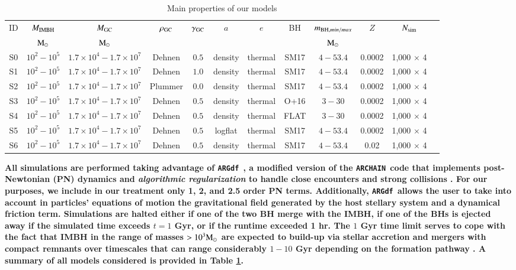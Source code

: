 \documentclass[article]{aa}
\newcommand{\Ms}{{\rm M}_\odot}
\newcommand{\gc}{{\rm GC}}
\newcommand{\ibh}{{\rm IMBH}}
\newcommand{\bh}{{\rm BH}}
\newcommand{\ARGdf}{\texttt{ARGdf~}}
\newcommand{\ARCHAIN}{\texttt{ARCHAIN~}}
\begin{document}
\begin{table}
\caption{Main properties of our models}
\begin{center}
\begin{tabular}{cccccccccccc}
\hline
\hline
ID & $M_\ibh$ & $M_\gc$ & $\rho_\gc$ & $\gamma_\gc$ & $a$ &$e$ &BH & $m_{\bh, min/max}$ & $Z$ & $N_{\rm sim}$ \\ 
   & $\Ms$    & $\Ms$   &            &              &     &    &   & $\Ms$              &     & \\
\hline
S0 & $10^2-10^5$ & $1.7\times 10^4 - 1.7\times 10^7$ & Dehnen & $0.5$ & density & thermal & SM17 & $4-53.4$ & 0.0002 & 1,000 $\times$ 4 \\
S1 & $10^2-10^5$ & $1.7\times 10^4 - 1.7\times 10^7$ & Dehnen & $1.0$ & density & thermal & SM17 & $4-53.4$ & 0.0002 & 1,000 $\times$ 4 \\
S2 & $10^2-10^5$ & $1.7\times 10^4 - 1.7\times 10^7$ & Plummer& $0.0$ & density & thermal & SM17 & $4-53.4$ & 0.0002 & 1,000 $\times$ 4 \\
S3 & $10^2-10^5$ & $1.7\times 10^4 - 1.7\times 10^7$ & Dehnen & $0.5$ & density & thermal & O+16 & $3-30$ & 0.0002 & 1,000 $\times$ 4 \\
S4 & $10^2-10^5$ & $1.7\times 10^4 - 1.7\times 10^7$ & Dehnen & $0.5$ & density & thermal & FLAT & $3-30$ & 0.0002 & 1,000 $\times$ 4 \\
S5 & $10^2-10^5$ & $1.7\times 10^4 - 1.7\times 10^7$ & Dehnen & $0.5$ & logflat & thermal & SM17 & $4-53.4$ & 0.0002 & 1,000 $\times$ 4 \\
S6 & $10^2-10^5$ & $1.7\times 10^4 - 1.7\times 10^7$ & Dehnen & $0.5$ & density & thermal & SM17 & $4-53.4$ & 0.02   & 1,000 $\times$ 4 \\
\hline
\end{tabular}
\label{tabt1}
\end{center}
\end{table}

{\bf 
All simulations are performed taking advantage of \ARGdf \citep{ASCD19}, a modified version of the \ARCHAIN code that implements post-Newtonian (PN) dynamics and {\it algorithmic regularization} to handle close encounters and strong collisions \citep{mikkola99,mikkola08}. For our purposes, we include in our treatment only 1, 2, and 2.5 order PN terms. Additionally, \ARGdf allows the user to take into account in particles' equations of motion the gravitational field generated by the host stellary system and a dynamical friction term. Simulations are halted either if one of the two BH merge with the IMBH, if one of the BHs is ejected away if the simulated time exceeds $t = 1$ Gyr, or if the runtime exceeded 1 hr. The $1$ Gyr time limit serves to cope with the fact that IMBH in the range of masses $>10^3\Ms$ are expected to build-up via stellar accretion and mergers with compact remnants over timescales that can range considerably $1-10$ Gyr depending on the formation pathway \citep[see for instance][]{giersz15}. A summary of all models considered is provided in Table \ref{tabt1}.
}
\end{document}
